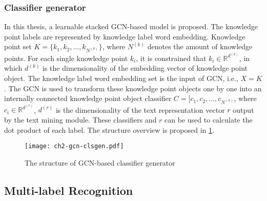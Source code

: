 \subsubsection{Classifier generator}


In this thesis, a learnable stacked GCN-based model is proposed. The knowledge point labels are represented by knowledge label word embedding. Knowledge point set \(K=\{k_1,k_2,\ldots,k_{N^{(k)}}\} \), where \(N^{(k)}\) denotes the amount of knowledge points. For each single knowledge point \(k_i\), it is constrained that \(k_i \in \mathbb{R}^ {d^{(k)}}\), in which \(d^{(k)}\) is the dimensionality of the embedding vector of knowledge point object. The knowledge label word embedding set is the input of GCN, i.e., \(X = K\). The GCN is used to transform these knowledge point objects one by one into an internally connected knowledge point object classifier \(C=[c_1,c_2,\ldots,c_{N^{(k)}}\), where \(c_i \in \mathbb {R}^{d^{(r)}}\), \(d^{(r)}\) is the dimensionality of the text representation vector \(r\) output by the text mining module. These classifiers and \(r\) can be used to calculate the dot product of each label. The structure overview is proposed in \figurename{\ref{fig:ch2-gcn-clsgen}}.

\begin{figure}[htbp!]
	\centering
	\texttt{[image: ch2-gcn-clsgen.pdf]}
	\caption{The structure of GCN-based classifier generator}\label{fig:ch2-gcn-clsgen}
\end{figure}

\subsection{Multi-label Recognition}


